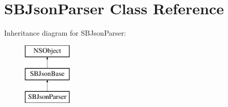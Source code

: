 \hypertarget{interface_s_b_json_parser}{
\section{SBJsonParser Class Reference}
\label{interface_s_b_json_parser}
}
Inheritance diagram for SBJsonParser:\begin{figure}[H]
\begin{center}
\leavevmode
\includegraphics[height=3.000000cm]{interface_s_b_json_parser}
\end{center}
\end{figure}
